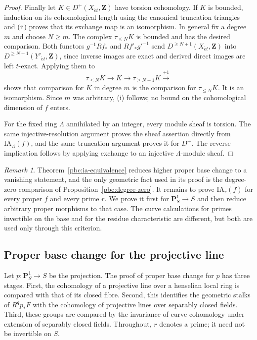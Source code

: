 \documentclass[11pt,a4paper]{article}
\numberwithin{equation}{section}
\theoremstyle{definition}
\theoremstyle{remark}
\newtheorem{remark}[theorem]{Remark}
\newcommand{\D}{D}
\newcommand{\et}{\acute{e}t}
\newcommand{\Z}{\mathbf Z}
\newcommand{\PP}{\mathbf P}
\begin{document}
\begin{proof}
Finally let $K\in\D^+(X_{\et},\Z)$ have torsion cohomology. If $K$
is bounded, induction on its cohomological length using the canonical
truncation triangles and (ii) proves that its exchange map is an
isomorphism. In general fix a degree $m$ and choose $N\geq m$.
The complex $\tau_{\leq N}K$ is bounded and has the desired
comparison. Both functors $g^{-1}Rf_*$ and $Rf'_*g'^{-1}$ send
$\D^{\geq N+1}(X_{\et},\Z)$ into $\D^{\geq N+1}(Y'_{\et},\Z)$, since inverse images are exact
and derived direct images are left $t$-exact. Applying them to
\[
 \tau_{\leq N}K\longrightarrow K\longrightarrow
 \tau_{\geq N+1}K\xrightarrow{+1}
\]
shows that comparison for $K$ in degree $m$ is the comparison for
$\tau_{\leq N}K$. It is an isomorphism. Since $m$ was arbitrary,
(i) follows; no bound on the cohomological dimension of $f$ enters.

For the fixed ring $\Lambda$ annihilated by an integer, every module
sheaf is torsion. The same injective-resolution argument proves the
sheaf assertion directly from $\mathrm{IA}_{\Lambda}(f)$, and the
same truncation argument proves it for $\D^+$. The reverse implication
follows by applying exchange to an injective $\Lambda$-module sheaf.
\end{proof}

\begin{remark}\label{pbc:proof-division}
Theorem~\ref{pbc:ia-equivalence} reduces higher proper base change
to a vanishing statement, and the only geometric fact used in its
proof is the degree-zero comparison of Proposition~\ref{pbc:degree-zero}. It remains
to prove $\mathrm{IA}_r(f)$ for every proper $f$ and every prime $r$.
We prove it first for $\PP^1_S\to S$ and then reduce arbitrary proper
morphisms to that case. The curve calculations for primes invertible
on the base and for the residue characteristic are different, but
both are used only through this criterion.
\end{remark}
\subsection{Proper base change for the projective line}
\label{pbc:projective-line-section}

Let $p:\PP^1_S\to S$ be the projection. The proof of proper base
change for $p$ has three stages. First, the cohomology of a projective
line over a henselian local ring is compared with that of its closed
fibre. Second, this identifies the geometric stalks of $R^qp_*F$ with
the cohomology of projective lines over separably closed fields.
Third, these groups are compared by the invariance of curve cohomology
under extension of separably closed fields. Throughout, $r$ denotes a
prime; it need not be invertible on $S$.
\end{document}
